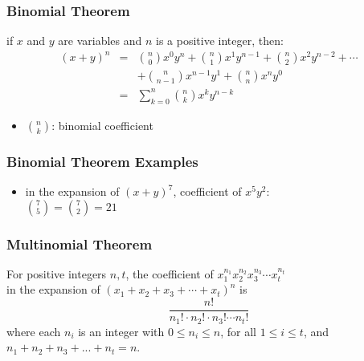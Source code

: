 \documentclass[dvipsnames]{beamer}
\begin{document}
\begin{frame}
  \frametitle{Binomial Theorem}

  \begin{theorem}
    if $x$ and $y$ are variables and $n$ is a positive integer, then:
    \begin{eqnarray*}
      (x+y)^n & = & {n\choose 0} x^0 y^n
                    + {n\choose 1} x^1 y^{n-1}
                    + {n\choose 2} x^2 y^{n-2} + \cdots\\
              &   & + {n\choose n-1} x^{n-1} y^1
                    + {n\choose n} x^n y^0 \\
              & = & \sum^n_{k=0}{{n\choose k} x^k y^{n-k}}
    \end{eqnarray*}
  \end{theorem}

  \begin{itemize}
    \item ${n\choose k}$: \alert{binomial coefficient}
  \end{itemize}
\end{frame}

\begin{frame}
  \frametitle{Binomial Theorem Examples}

  \begin{itemize}
    \item in the expansion of $(x+y)^7$, coefficient of $x^5 y^2$:\\
      ${7\choose 5} = {7 \choose 2} = 21$
  \end{itemize}
\end{frame}

\begin{frame}
  \frametitle{Multinomial Theorem}

  \begin{theorem}
    For positive integers $n, t$, the coefficient of
    $x_{1}^{n_1} x_{2}^{n_2} x_{3}^{n_3} \cdots x_{t}^{n_t}$\\
    in the expansion of $(x_1 + x_2 + x_3 + \cdots + x_t)^n$ is
    \begin{equation*}
      \frac{n!}{n_1! \cdot n_2! \cdot n_3! \cdots n_t!}
    \end{equation*}
    where each $n_i$ is an integer with $0 \leq n_i \leq n$,
    for all $1 \leq i \leq t$, and\\
    $n_1 + n_2 + n_3 + ... + n_t = n$.
  \end{theorem}
\end{frame}
\end{document}
